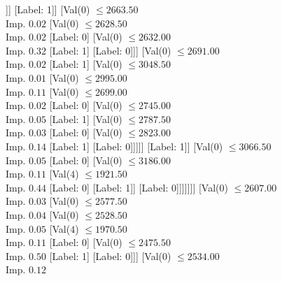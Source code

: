 \documentclass[margin=10pt]{standalone}
\begin{document}
\begin{forest}
											[Val($0$) $ \leq 2496.50$ \\ Imp. $0.20$
												[Val($0$) $ \leq 2464.00$ \\ Imp. $0.18$
													[Label: 1]
													[Val($4$) $ \leq 1911.50$ \\ Imp. $0.32$
														[Label: 1]
														[Label: 0]]]
												[Label: 1]]
											[Val($0$) $ \leq 2663.50$ \\ Imp. $0.02$
												[Val($0$) $ \leq 2628.50$ \\ Imp. $0.02$
													[Label: 0]
													[Val($0$) $ \leq 2632.00$ \\ Imp. $0.32$
														[Label: 1]
														[Label: 0]]]
												[Val($0$) $ \leq 2691.00$ \\ Imp. $0.02$
													[Label: 1]
													[Val($0$) $ \leq 3048.50$ \\ Imp. $0.01$
														[Val($0$) $ \leq 2995.00$ \\ Imp. $0.11$
															[Val($0$) $ \leq 2699.00$ \\ Imp. $0.02$
																[Label: 0]
																[Val($0$) $ \leq 2745.00$ \\ Imp. $0.05$
																	[Label: 1]
																	[Val($0$) $ \leq 2787.50$ \\ Imp. $0.03$
																		[Label: 0]
																		[Val($0$) $ \leq 2823.00$ \\ Imp. $0.14$
																			[Label: 1]
																			[Label: 0]]]]]
															[Label: 1]]
														[Val($0$) $ \leq 3066.50$ \\ Imp. $0.05$
															[Label: 0]
															[Val($0$) $ \leq 3186.00$ \\ Imp. $0.11$
																[Val($4$) $ \leq 1921.50$ \\ Imp. $0.44$
																	[Label: 0]
																	[Label: 1]]
																[Label: 0]]]]]]]
										[Val($0$) $ \leq 2607.00$ \\ Imp. $0.03$
											[Val($0$) $ \leq 2577.50$ \\ Imp. $0.04$
												[Val($0$) $ \leq 2528.50$ \\ Imp. $0.05$
													[Val($4$) $ \leq 1970.50$ \\ Imp. $0.11$
														[Label: 0]
														[Val($0$) $ \leq 2475.50$ \\ Imp. $0.50$
															[Label: 1]
															[Label: 0]]]
													[Val($0$) $ \leq 2534.00$ \\ Imp. $0.12$

\end{forest}
\end{document}
